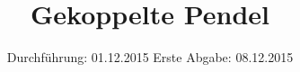 

\subject{Versuch 106}
\title{Gekoppelte Pendel}
\date{
  Durchführung: 01.12.2015
  \hspace{3em}
  Erste Abgabe: 08.12.2015
}



\maketitle
\thispagestyle{empty}
\tableofcontents
\newpage






\nocite{anleitung}
\printbibliography


